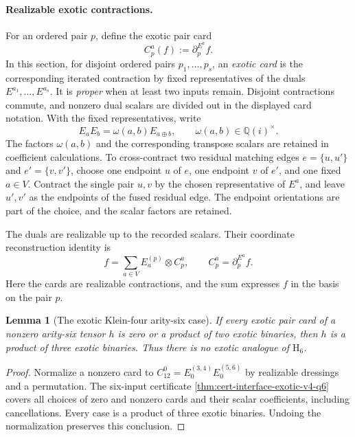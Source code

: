 \documentclass[11pt,letterpaper,onecolumn]{article}
\theoremstyle{plain}
\newtheorem{lemma}[lemma]{Lemma}
\theoremstyle{definition}
\theoremstyle{remark}
\newcommand{\Hcore}{\mathrm{H}_6}
\begin{document}
\paragraph{Realizable exotic contractions.}
For an ordered pair \(p\), define the exotic pair card
\[
 C_p^a(f):=\partial_p^{E^a}f.
\]
In this section, for disjoint ordered pairs \(p_1,\ldots,p_s\), an
\emph{exotic card} is
the corresponding iterated contraction by fixed representatives of
the duals \(E^{a_1},\ldots,E^{a_s}\). It is \emph{proper} when at least two
inputs remain.  Disjoint contractions commute, and nonzero dual scalars are divided out in the displayed card notation.
With the fixed representatives, write
\[
 E_aE_b=\omega(a,b)E_{a\oplus b},
 \qquad \omega(a,b)\in\mathbb Q(i)^\times.
\]
The factors \(\omega(a,b)\) and the corresponding transpose scalars
are retained in coefficient calculations. To cross-contract two residual
matching edges \(e=\{u,u'\}\) and
\(e'=\{v,v'\}\), choose one endpoint \(u\) of \(e\), one endpoint \(v\) of
\(e'\), and one fixed \(a\in V\). Contract the single pair \(u,v\) by the
chosen representative of \(E^a\), and leave \(u',v'\) as the endpoints
of the fused residual edge.  The endpoint orientations are part of the
choice, and the scalar factors are retained.

The duals are realizable up to the recorded scalars. Their coordinate
reconstruction identity is
\begin{equation}
 f=\sum_{a\in V}E_a^{(p)}\otimes C_p^a,
 \qquad C_p^a=\partial_p^{E^a}f.
 \label{eq:exotic-v4-tomography}
\end{equation}
Here the cards are realizable contractions, and the sum expresses
\(f\) in the basis on the pair \(p\).

\begin{lemma}[The exotic Klein-four arity-six case]
\label{lem:exotic-v4-q6}
If every exotic pair card of a nonzero arity-six tensor \(h\) is zero or a
product of two exotic binaries, then \(h\) is a product of three exotic
binaries.  Thus there is no exotic analogue of \(\Hcore\).
\end{lemma}

\begin{proof}
Normalize a nonzero card to \(C_{12}^0=E_0^{(3,4)}E_0^{(5,6)}\) by realizable dressings
and a permutation. The six-input certificate
\cref{thm:cert-interface-exotic-v4-q6} covers all choices of zero and
nonzero cards and their scalar coefficients, including cancellations.
Every case is a product of three exotic binaries. Undoing the
normalization preserves this conclusion.
\end{proof}
\end{document}
